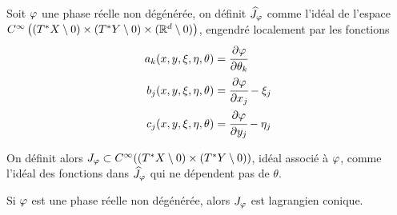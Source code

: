 \begin{defn}
	Soit $\varphi$ une phase réelle non dégénérée, on définit $\widehat{J}_\varphi $ comme l'idéal de l'espace $ C^{\infty}\left((T^*X\setminus 0)\times (T^*Y\setminus 0) \times (\mathbb{R}^d \setminus 0)\right)$, engendré localement par les fonctions
	\begin{align*}
		a_k(x,y,\xi,\eta,\theta)&=\cfrac{\partial \varphi}{\partial \theta_k}\\
		b_j(x,y,\xi,\eta,\theta) &= \cfrac{\partial \varphi}{\partial x_j}-\xi_j\\
		c_j(x,y,\xi,\eta,\theta) &= \cfrac{\partial \varphi}{\partial y_j}-\eta_j
	\end{align*}
	
	On définit alors $J_{\varphi}\subset C^{\infty}((T^*X\setminus 0)\times (T^*Y\setminus 0))$, idéal associé à $\varphi$, comme l'idéal des fonctions dans $\widehat{J}_{\varphi}$ qui ne dépendent pas de $\theta$.
\end{defn}
\begin{prop}
	Si $\varphi$ est une phase réelle non dégénérée, alors $J_{\varphi}$ est lagrangien conique.
\end{prop}
